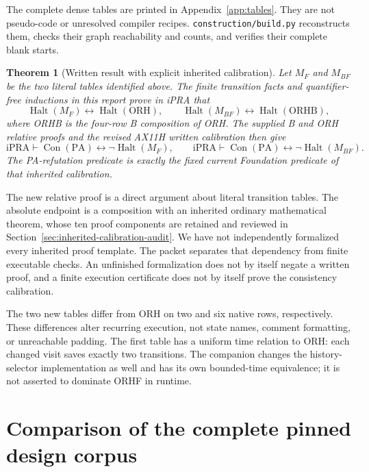 \documentclass[11pt]{article}
\newcommand{\ipra}{\mathrm{iPRA}}
\newcommand{\PA}{\mathrm{PA}}
\newcommand{\Con}{\operatorname{Con}}
\newcommand{\Halt}{\operatorname{Halt}}
\newtheorem{theorem}{Theorem}
\begin{document}
\begin{center}\end{center}

The complete dense tables are printed in Appendix~\ref{app:tables}. They are not pseudo-code or unresolved compiler recipes. \texttt{construction/build.py} reconstructs them, checks their graph reachability and counts, and verifies their complete blank starts.

\begin{theorem}[Written result with explicit inherited calibration]
Let $M_F$ and $M_{BF}$ be the two literal tables identified above. The finite transition facts and quantifier-free inductions in this report prove in iPRA that
\[
 \Halt(M_F)\leftrightarrow\Halt(\mathrm{ORH}),\qquad
 \Halt(M_{BF})\leftrightarrow\Halt(\mathrm{ORHB}),
\]
where ORHB is the four-row B composition of ORH. The supplied B and ORH relative proofs and the revised AX11H written calibration then give
\[
 \ipra\vdash \Con(\PA)\leftrightarrow\neg\Halt(M_F),\qquad
 \ipra\vdash \Con(\PA)\leftrightarrow\neg\Halt(M_{BF}).
\]
The PA-refutation predicate is exactly the fixed current Foundation predicate of that inherited calibration.
\end{theorem}

The new relative proof is a direct argument about literal transition tables. The absolute endpoint is a composition with an inherited ordinary mathematical theorem, whose ten proof components are retained and reviewed in Section~\ref{sec:inherited-calibration-audit}. We have not independently formalized every inherited proof template. The packet separates that dependency from finite executable checks. An unfinished formalization does not by itself negate a written proof, and a finite execution certificate does not by itself prove the consistency calibration.

The two new tables differ from ORH on two and six native rows, respectively. These differences alter recurring execution, not state names, comment formatting, or unreachable padding. The first table has a uniform time relation to ORH: each changed visit saves exactly two transitions. The companion changes the history-selector implementation as well and has its own bounded-time equivalence; it is not asserted to dominate ORHF in runtime.

\section{Comparison of the complete pinned design corpus}
\end{document}
